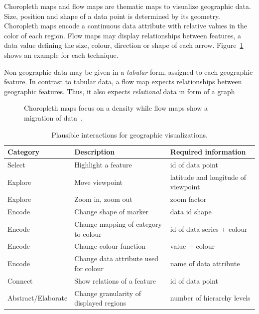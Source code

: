 Choropleth maps and flow maps are thematic maps to visualize geographic data.
Size, position and shape of a data point is determined by its geometry.
Choropleth maps encode a continuous data attribute with relative values in the color of each region.
Flow maps may display relationships between features, a data value defining the size, colour, direction or shape of each arrow.
Figure~\ref{fig:analysis:geographical} shows an example for each technique.

Non-geographic data may be given in a \emph{tabular} form, assigned to each geographic feature.
In contrast to tabular data, a flow map expects relationships between geographic features.
Thus, it also expects \emph{relational} data in form of a graph

\begin{figure}
  \centering
  \qquad
  \caption{Choropleth maps focus on a density while flow maps show a migration of data~\parencite{VisualizationCatalogue2017}.}%
  \label{fig:analysis:geographical}
\end{figure}

\begin{table}[H]
  \caption{Plausible interactions for geographic visualizations.}%
  \label{tab:analysis:geographical:interactions}
  \begin{tabularx}{\linewidth}{lXX}
    \bf Category & \bf Description & \bf Required information \\
    \hline
    Select & Highlight a feature & id of data point \\
    Explore & Move viewpoint & latitude and longitude of viewpoint \\
    Explore & Zoom in, zoom out & zoom factor \\
    Encode & Change shape of marker & data id  shape \\
    Encode & Change mapping of category to colour & id of data series + colour \\
    Encode & Change colour function & value + colour \\
    Encode & Change data attribute used for colour & name of data attribute \\
    Connect & Show relations of a feature & id of data point  \\
    Abstract/Elaborate & Change granularity of displayed regions & number of hierarchy levels \\
  \end{tabularx}
\end{table}

